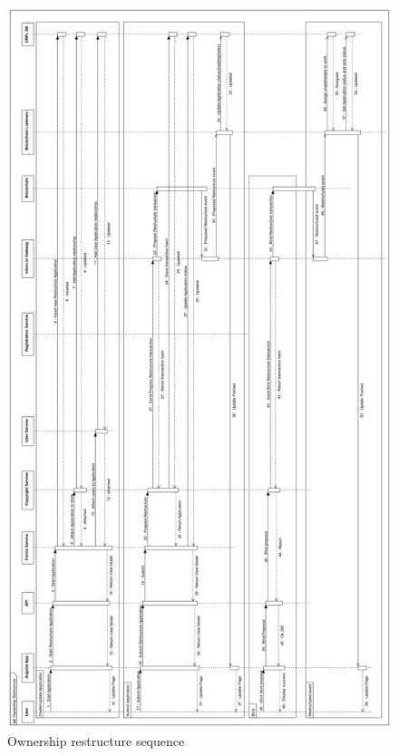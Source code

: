\begin{figure}[H]
\caption{Ownership restructure sequence}
\centering
\includegraphics[width=\textwidth,height=\textheight,keepaspectratio]{images/operational/OwnershipRestructure}
\end{figure}

